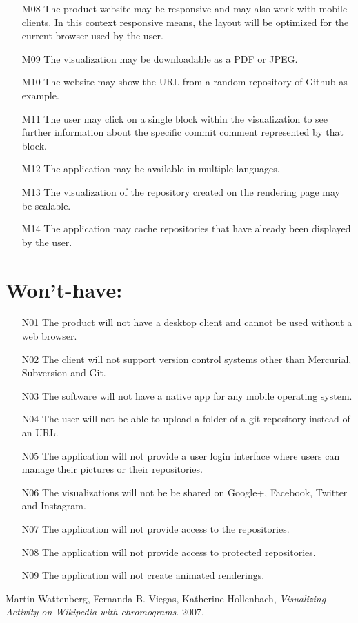 \documentclass[12pt]{scrartcl}
\begin{document}
\begin{enumerate}
\item [M08] The product website may be responsive and may also work with mobile clients. In this context responsive means, the layout will be optimized for the current browser used by the user.
\item [M09] The visualization may be downloadable as a PDF or JPEG.
\item [M10] The website may show the URL from a random repository of Github as example. 
\item [M11] The user may click on a single block within the visualization to see further information about the specific commit comment represented by that block.
\item [M12] The application may be available in multiple languages.
\item [M13] The visualization of the repository created on the rendering page may be scalable.
\item [M14] The application may cache repositories that have already been displayed by the user.
\end{enumerate}
\section{Won't-have:}
\begin{enumerate}
\item [N01] The product will not have a desktop client and cannot be used without a web browser.
\item [N02] The client will not support version control systems other than Mercurial, Subversion and Git.
\item [N03] The software will not have a native app for any mobile operating system.
\item [N04] The user will not be able to upload a folder of a git repository instead of an URL.
\item [N05] The application will not provide a user login interface where users can manage their pictures or their repositories.
\item [N06] The visualizations will not be be shared on Google+, Facebook, Twitter and Instagram.
\item [N07] The application will not provide access to the repositories.
\item [N08] The application will not provide access to protected repositories.
\item [N09] The application will not create animated renderings.
\end{enumerate}


\begin{thebibliography}{9}

  Martin Wattenberg, Fernanda B. Viegas, Katherine Hollenbach,  
  \emph{Visualizing Activity on Wikipedia with chromograms}.
  2007.

\end{thebibliography}
\end{document}
